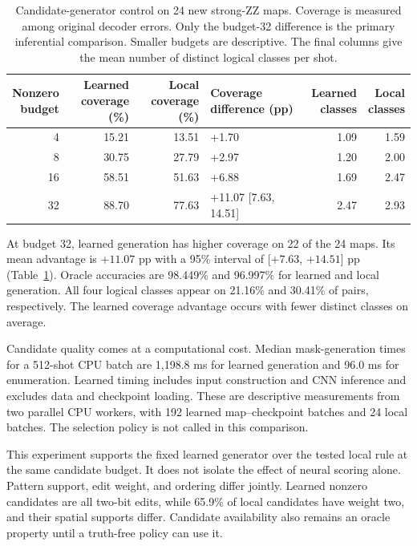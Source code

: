 \documentclass[aps,prd,12pt,twocolumn,superscriptaddress,floatfix]{revtex4-2}
\begin{document}
\begin{table}[tb]
\centering
\caption{Candidate-generator control on 24 new strong-ZZ maps. Coverage is measured among original decoder errors. Only the budget-32 difference is the primary inferential comparison. Smaller budgets are descriptive. The final columns give the mean number of distinct logical classes per shot.}
\label{tab:candidate-control}
\small
\begin{tabularx}{\textwidth}{@{}r rr >{\raggedright\arraybackslash}X rr@{}}
\toprule
\shortstack{Nonzero\\budget} & \shortstack{Learned\\coverage (\%)} & \shortstack{Local\\coverage (\%)} & Coverage difference (pp) & \shortstack{Learned\\classes} & \shortstack{Local\\classes} \\
\midrule
4 & 15.21 & 13.51 & +1.70 & 1.09 & 1.59 \\
8 & 30.75 & 27.79 & +2.97 & 1.20 & 2.00 \\
16 & 58.51 & 51.63 & +6.88 & 1.69 & 2.47 \\
32 & 88.70 & 77.63 & +11.07 [7.63, 14.51] & 2.47 & 2.93 \\
\bottomrule
\end{tabularx}
\end{table}

At budget 32, learned generation has higher coverage on 22 of the 24 maps. Its mean advantage is \(+11.07\) pp with a 95\% interval of [\( +7.63\), \(+14.51\)] pp (Table~\ref{tab:candidate-control}). Oracle accuracies are 98.449\% and 96.997\% for learned and local generation. All four logical classes appear on 21.16\% and 30.41\% of pairs, respectively. The learned coverage advantage occurs with fewer distinct classes on average.

Candidate quality comes at a computational cost. Median mask-generation times for a 512-shot CPU batch are 1,198.8 ms for learned generation and 96.0 ms for enumeration. Learned timing includes input construction and CNN inference and excludes data and checkpoint loading. These are descriptive measurements from two parallel CPU workers, with 192 learned map--checkpoint batches and 24 local batches. The selection policy is not called in this comparison.

This experiment supports the fixed learned generator over the tested local rule at the same candidate budget. It does not isolate the effect of neural scoring alone. Pattern support, edit weight, and ordering differ jointly. Learned nonzero candidates are all two-bit edits, while 65.9\% of local candidates have weight two, and their spatial supports differ. Candidate availability also remains an oracle property until a truth-free policy can use it.
\end{document}
